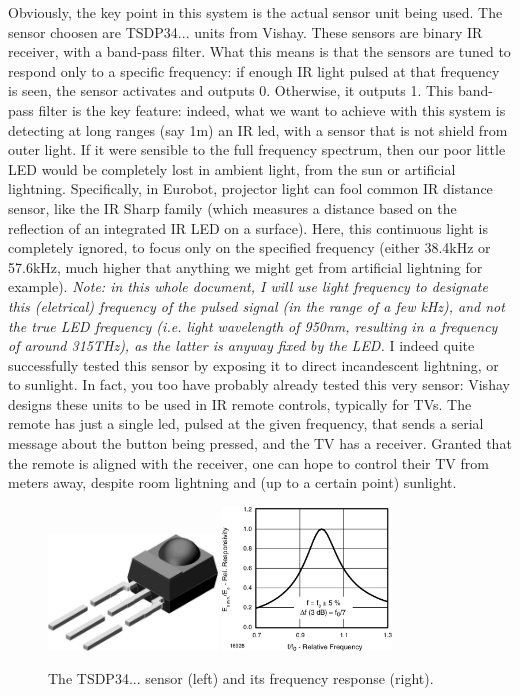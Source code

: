 \documentclass[a4paper,11pt]{article}
\begin{document}
Obviously, the key point in this system is the actual sensor unit being used. The sensor choosen are TSDP34... units from Vishay. These sensors are binary IR receiver, with a band-pass filter. What this means is that the sensors are tuned to respond only to a specific frequency: if enough IR light pulsed at that frequency is seen, the sensor activates and outputs 0. Otherwise, it outputs 1. This band-pass filter is the key feature: indeed, what we want to achieve with this system is detecting at long ranges (say 1m) an IR led, with a sensor that is not shield from outer light. If it were sensible to the full frequency spectrum, then our poor little LED would be completely lost in ambient light, from the sun or artificial lightning. Specifically, in Eurobot, projector light can fool common IR distance sensor, like the IR Sharp family (which measures a distance based on the reflection of an integrated IR LED on a surface). Here, this continuous light is completely ignored, to focus only on the specified frequency (either 38.4kHz or 57.6kHz, much higher that anything we might get from artificial lightning for example). \emph{Note: in this whole document, I will use light frequency to designate this (eletrical) frequency of the pulsed signal (in the range of a few kHz), and not the true LED frequency (i.e. light wavelength of 950nm, resulting in a frequency of around 315THz), as the latter is anyway fixed by the LED.} I indeed quite successfully tested this sensor by exposing it to direct incandescent lightning, or to sunlight. In fact, you too have probably already tested this very sensor: Vishay designs these units to be used in IR remote controls, typically for TVs. The remote has just a single led, pulsed at the given frequency, that sends a serial message about the button being pressed, and the TV has a receiver. Granted that the remote is aligned with the receiver, one can hope to control their TV from meters away, despite room lightning and (up to a certain point) sunlight.


\begin{figure}[h]
  \centering
  \includegraphics[width=0.4\textwidth]{Figures/TSDPSensor.jpg}
  \includegraphics[width=0.4\textwidth]{Figures/TSDPFrequencyResponse.jpg}
  \caption{The TSDP34... sensor (left) and its frequency response (right).}
\end{figure}
\end{document}
